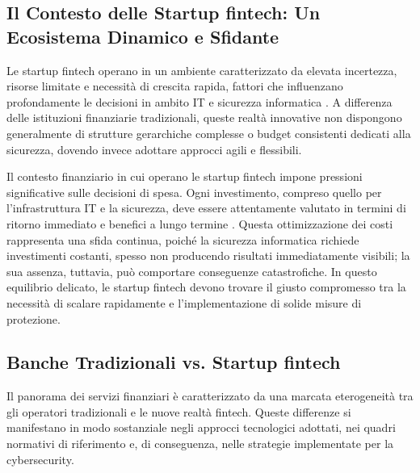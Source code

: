 \subsection{Il Contesto delle Startup fintech: Un Ecosistema Dinamico e Sfidante}

Le startup fintech operano in un ambiente caratterizzato da elevata incertezza, risorse limitate e necessità di crescita rapida, fattori che influenzano profondamente le decisioni in ambito IT e sicurezza informatica \cite{fintechChallenges}. A differenza delle istituzioni finanziarie tradizionali, queste realtà innovative non dispongono generalmente di strutture gerarchiche complesse o budget consistenti dedicati alla sicurezza, dovendo invece adottare approcci agili e flessibili.

Il contesto finanziario in cui operano le startup fintech impone pressioni significative sulle decisioni di spesa. Ogni investimento, compreso quello per l'infrastruttura IT e la sicurezza, deve essere attentamente valutato in termini di ritorno immediato e benefici a lungo termine \cite{fintechChallenges}. Questa ottimizzazione dei costi rappresenta una sfida continua, poiché la sicurezza informatica richiede investimenti costanti, spesso non producendo risultati immediatamente visibili; la sua assenza, tuttavia, può comportare conseguenze catastrofiche. In questo equilibrio delicato, le startup fintech devono trovare il giusto compromesso tra la necessità di scalare rapidamente e l'implementazione di solide misure di protezione.

\subsection{Banche Tradizionali vs. Startup fintech}
Il panorama dei servizi finanziari è caratterizzato da una marcata eterogeneità tra gli operatori tradizionali e le nuove realtà fintech. Queste differenze si manifestano in modo sostanziale negli approcci tecnologici adottati, nei quadri normativi di riferimento e, di conseguenza, nelle strategie implementate per la cybersecurity.

